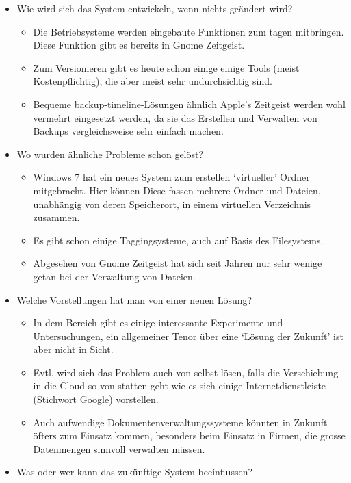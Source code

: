\documentclass[10pt,paper=a4,final]{scrartcl}
\begin{document}
\begin{itemize}
  \item Wie wird sich das System entwickeln, wenn nichts geändert wird?
    \begin{itemize}
      \item Die Betriebsysteme werden eingebaute Funktionen zum tagen mitbringen. Diese Funktion gibt es bereits in Gnome Zeitgeist.
      \item Zum Versionieren gibt es heute schon einige einige Tools (meist Kostenpflichtig), die aber meist sehr undurchsichtig sind.
      \item Bequeme backup-timeline-Lösungen ähnlich Apple’s Zeitgeist werden wohl vermehrt eingesetzt werden, da sie das Erstellen und Verwalten von Backups vergleichsweise sehr einfach machen.
    \end{itemize}
  \item Wo wurden ähnliche Probleme schon gelöst?
    \begin{itemize}
      \item Windows 7 hat ein neues System zum erstellen ‘virtueller’ Ordner mitgebracht. Hier können Diese fassen mehrere Ordner und Dateien, unabhängig von deren Speicherort, in einem virtuellen Verzeichnis zusammen.
      \item Es gibt schon einige Taggingsysteme, auch auf Basis des Filesystems. 
      \item Abgesehen von Gnome Zeitgeist hat sich seit Jahren nur sehr wenige getan bei der Verwaltung von Dateien.
    \end{itemize}
  \item Welche Vorstellungen hat man von einer neuen Lösung?
    \begin{itemize}
      \item In dem Bereich gibt es einige interessante Experimente und Untersuchungen, ein allgemeiner Tenor über eine ‘Lösung der Zukunft’ ist aber nicht in Sicht.
      \item Evtl. wird sich das Problem auch von selbst lösen, falls die Verschiebung in die Cloud so von statten geht wie es sich einige Internetdienstleiste (Stichwort Google) vorstellen.
      \item Auch aufwendige Dokumentenverwaltungssysteme könnten in Zukunft öfters zum Einsatz kommen, besonders beim Einsatz in Firmen, die grosse Datenmengen sinnvoll verwalten müssen.
    \end{itemize}
  \item Was oder wer kann das zukünftige System beeinflussen?
    \begin{itemize}

\end{itemize}
\end{itemize}
\end{document}
